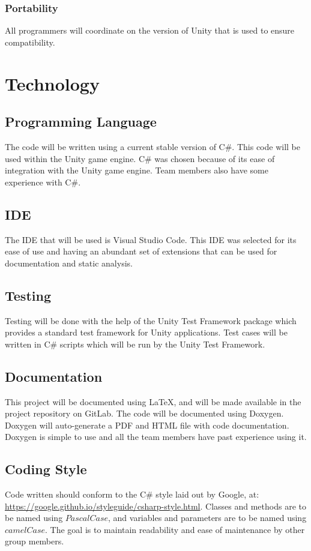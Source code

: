 \documentclass[12pt,letterpaper]{article}
\begin{document}
\subsubsection{Portability}
All programmers will coordinate on the version of Unity that is used to ensure compatibility.
 
\section{Technology}
\subsection{Programming Language}
The code will be written using a current stable version of C\#. This code will be used within the Unity game engine. C\# was chosen because of its ease of integration with the Unity game engine. Team members also have some experience with C\#.
\subsection{IDE}
The IDE that will be used is Visual Studio Code. This IDE was selected for its ease of use and having an abundant set of extensions that can be used for documentation and static analysis.
\subsection{Testing}
Testing will be done with the help of the Unity Test Framework package which provides a standard test framework for Unity applications. Test cases will be written in C\# scripts which will be run by the Unity Test Framework.
\subsection{Documentation}
This project will be documented using LaTeX, and will be made available in the project repository on GitLab. The code will be documented using Doxygen. Doxygen will auto-generate a PDF and HTML file with code documentation. Doxygen is simple to use and all the team members have past experience using it.

\subsection{Coding Style}
Code written should conform to the C\# style laid out by Google, at: \url{https://google.github.io/styleguide/csharp-style.html}. Classes and methods are to be named using $PascalCase$, and variables and parameters are to be named using $camelCase$.
\newline
The goal is to maintain readability and ease of maintenance by other group members.
\end{document}
